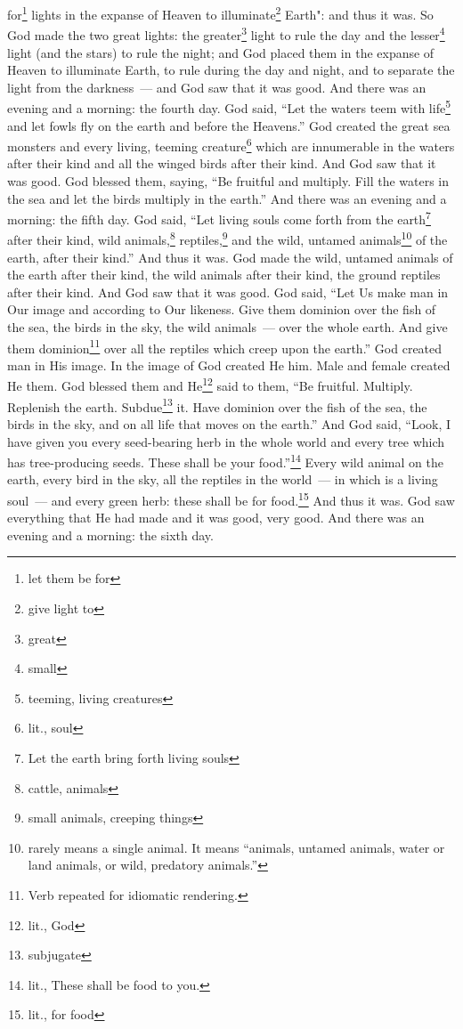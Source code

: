 \begin{enumerate}[align=center]
     for\footnote{let them be for} lights in the expanse of Heaven to illuminate\footnote{give light to} Earth": and thus it was.%
     So God made the two great lights: the greater\footnote{great} light to rule the day and the lesser\footnote{small} light (and the stars) to rule the night;%
     and God placed them in the expanse of Heaven to illuminate Earth,%
     to rule during the day and night, and to separate the light from the darkness~--- and God saw that it was good.%
     And there was an evening and a morning: the fourth day.%
     God said, ``Let the waters teem with life\footnote{teeming, living creatures} and let fowls fly on the earth and before the Heavens.''%
     God created the great sea monsters and every living, teeming creature\footnote{lit., soul} which are innumerable in the waters after their kind and all the winged birds after their kind. And God saw that it was good.%
     God blessed them, saying, ``Be fruitful and multiply. Fill the waters in the sea and let the birds multiply in the earth.''%
     And there was an evening and a morning: the fifth day.%
     God said, ``Let living souls come forth from the earth\footnote{Let the earth bring forth living souls} after their kind, wild animals,\footnote{cattle, animals} reptiles,\footnote{small animals, creeping things} and the wild, untamed animals\footnote{ rarely means a single animal. It means ``animals, untamed animals, water or land animals, or wild, predatory animals.''} of the earth, after their kind.'' And thus it was.%
     God made the wild, untamed animals of the earth after their kind, the wild animals after their kind, the ground reptiles after their kind. And God saw that it was good.%
     God said, ``Let Us make man in Our image and according to Our likeness. Give them dominion over the fish of the sea, the birds in the sky, the wild animals~--- over the whole earth. And give them dominion\footnote{Verb repeated for idiomatic rendering.} over all the reptiles which creep upon the earth.''%
     God created man in His image. In the image of God created He him. Male and female created He them.%
     God blessed them and He\footnote{lit., God} said to them, ``Be fruitful. Multiply. Replenish the earth. Subdue\footnote{subjugate} it. Have dominion over the fish of the sea, the birds in the sky, and on all life that moves on the earth.''%
     And God said, ``Look, I have given you every seed-bearing herb in the whole world and every tree which has tree-producing seeds. These shall be your food.''\footnote{lit., These shall be food to you.}%
     Every wild animal on the earth, every bird in the sky, all the reptiles in the world~--- in which is a living soul~--- and every green herb: these shall be for food.\footnote{lit., for food} And thus it was.%
     God saw everything that He had made and it was good, very good. And there was an evening and a morning: the sixth day.%
\end{enumerate}
